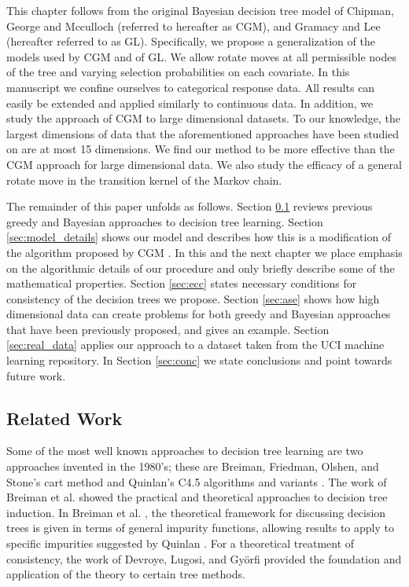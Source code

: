 This chapter follows from the original Bayesian decision tree model of Chipman, George and Mcculloch \cite{chipman1998bayesian} (referred to hereafter as CGM), and Gramacy and Lee \cite{gramacy2008bayesian}(hereafter referred to as GL). Specifically, we propose a generalization of the models used by CGM and of GL. We allow rotate moves at all permissible nodes of the tree and varying selection probabilities on each covariate. In this manuscript we confine ourselves to categorical response data. All results can easily be extended and applied similarly to continuous data. In addition, we study the approach of CGM to large dimensional datasets. To our knowledge, the largest dimensions of data that the aforementioned approaches have been studied on are at most 15 dimensions. We find our method to be more effective than the CGM approach for large dimensional data. We also study the efficacy of a general rotate move in the transition kernel of the Markov chain.

The remainder of this paper unfolds as follows. Section \ref{sec:related_work} reviews previous greedy and Bayesian approaches to decision tree learning. Section \ref{sec:model_details} shows our model and describes how this is a modification of the algorithm proposed by CGM \cite{chipman1998bayesian}. In this and the next chapter we place emphasis on the algorithmic details of our procedure and only briefly describe some of the mathematical properties. Section \ref{sec:ecc} states necessary conditions for consistency of the decision trees we propose. Section \ref{sec:ase} shows how high dimensional data can create problems for both greedy and Bayesian approaches that have been previously proposed, and gives an example. Section \ref{sec:real_data} applies our approach to a dataset taken from the UCI machine learning repository. In Section \ref{sec:conc} we state conclusions and point towards future work.

\subsection{Related Work}\label{sec:related_work}
Some of the most well known approaches to decision tree learning are two approaches invented in the 1980's; these are Breiman, Friedman, Olshen, and Stone's cart method \cite{breiman1984classification} and Quinlan's C4.5 algorithms and variants \cite{quinlan1993c4}.  
The work of Breiman et al. \cite{breiman1984classification} showed the practical and theoretical approaches to decision tree induction. In Breiman et al. \cite{breiman1984classification}, the theoretical framework for discussing decision trees is given in terms of general impurity functions, allowing results to apply to specific impurities suggested by Quinlan \cite{quinlan1993c4}. For a theoretical treatment of consistency, the work of Devroye, Lugosi, and Gy\"{o}rfi \cite{devroye1996probabilistic} provided the foundation and application of the theory to certain tree methods.

